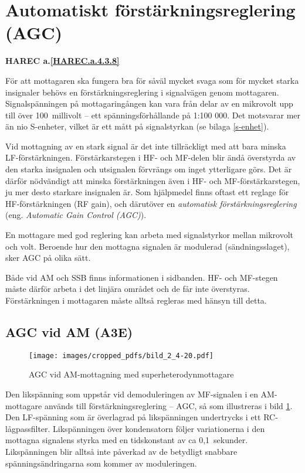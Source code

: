 \section[AGC]{Automatiskt förstärkningsreglering (AGC)}
\textbf{HAREC a.\ref{HAREC.a.4.3.8}\label{myHAREC.a.4.3.8}}

För att mottagaren ska fungera bra för såväl mycket svaga som för mycket starka
insignaler behövs en förstärkningsreglering i signalvägen genom mottagaren.
Signalspänningen på mottagaringången kan vara från delar av en mikrovolt upp
till över 100~millivolt -- ett spänningsförhållande på 1:100 000.
Det motsvarar mer än nio S-enheter, vilket är ett mått på signalstyrkan
(se bilaga \ref{s-enhet}).

Vid mottagning av en stark signal är det inte tillräckligt med att
bara minska LF-förstärkningen.
Förstärkarstegen i HF- och MF-delen blir ändå överstyrda av den starka
insignalen och utsignalen förvrängs om inget ytterligare görs.
Det är därför nödvändigt att minska förstärkningen även i HF- och
MF-förstärkarstegen, ju mer desto starkare insignalen är.
Som hjälpmedel finns oftast ett reglage för HF-förstärkningen (RF gain), och
därutöver en \emph{automatisk förstärkningsreglering} (eng. \emph{Automatic Gain Control (AGC)}).

En mottagare med god reglering kan arbeta med signalstyrkor mellan mikrovolt
och volt.
Beroende hur den mottagna signalen är modulerad (sändningsslaget), sker AGC
på olika sätt.

Både vid AM och SSB finns informationen i sidbanden.
HF- och MF-stegen måste därför arbeta i det linjära området och de får inte
överstyras.
Förstärkningen i mottagaren måste alltså regleras med hänsyn till detta.

\subsection{AGC vid AM (A3E)}

\begin{figure}
  \texttt{[image: images/cropped\_pdfs/bild\_2\_4-20.pdf]}
  \caption{AGC vid AM-mottagning med superheterodynmottagare}
  \label{fig:bildII4-20}
\end{figure}

Den likspänning som uppstår vid demoduleringen av MF-signalen i en
AM-mottagare används till förstärkningsreglering -- AGC, så som illustreras
i bild \ref{fig:bildII4-20}.
Den LF-spänning som är överlagrad på likspänningen undertrycks i ett
RC-lågpassfilter.
Likspänningen över kondensatorn följer variationerna i den mottagna signalens
styrka med en tidskonstant av ca 0,1~sekunder.
Likspänningen blir alltså inte påverkad av de betydligt snabbare
spänningsändringarna som kommer av moduleringen.

